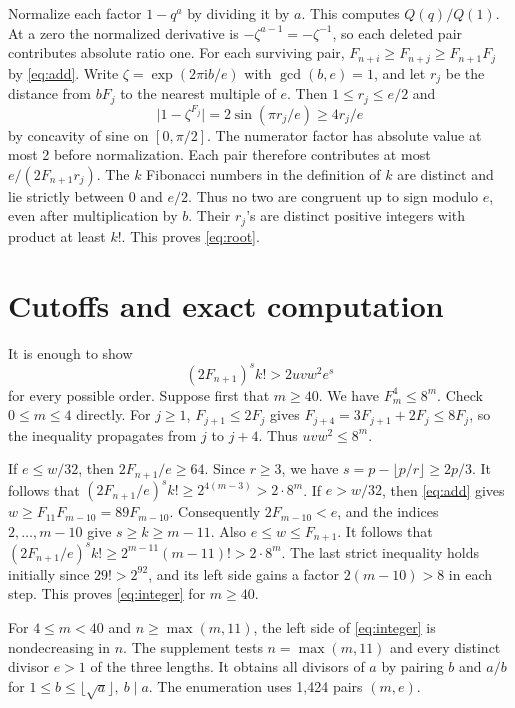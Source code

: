\documentclass[11pt]{article}
\newcommand{\abs}[1]{\lvert#1\rvert}
\begin{document}
Normalize each factor \(1-q^a\) by dividing it by \(a\). This
computes \(Q(q)/Q(1)\). At a zero the normalized derivative is
\(-\zeta^{a-1}=-\zeta^{-1}\), so each deleted pair contributes
absolute ratio one. For each surviving pair,
\(F_{n+i}\ge F_{n+j}\ge F_{n+1}F_j\) by \eqref{eq:add}.
Write \(\zeta=\exp(2\pi\mathrm{i}b/e)\) with \(\gcd(b,e)=1\), and
let \(r_j\) be the distance from \(bF_j\) to the nearest multiple
of \(e\). Then \(1\le r_j\le e/2\) and
\[
 \abs{1-\zeta^{F_j}}=2\sin(\pi r_j/e)\ge 4r_j/e
\]
by concavity of sine on \([0,\pi/2]\). The numerator factor has
absolute value at most 2 before normalization. Each pair therefore
contributes at most \(e/(2F_{n+1}r_j)\).
The \(k\) Fibonacci numbers in the definition of \(k\) are distinct
and lie strictly between 0 and \(e/2\). Thus no two are congruent
up to sign modulo \(e\), even after multiplication by \(b\).
Their \(r_j\)'s are distinct positive integers with product at least
\(k!\). This proves \eqref{eq:root}.

\section{Cutoffs and exact computation}
It is enough to show
\begin{equation}\label{eq:integer}
  (2F_{n+1})^s k!> 2uvw^2 e^s
\end{equation}
for every possible order. Suppose first that \(m\ge40\).
We have \(F_m^4\le8^m\). Check \(0\le m\le4\) directly. For \(j\ge1\),
\(F_{j+1}\le2F_j\) gives \(F_{j+4}=3F_{j+1}+2F_j\le8F_j\), so
the inequality propagates from \(j\) to \(j+4\). Thus \(uvw^2\le8^m\).

If \(e\le w/32\), then \(2F_{n+1}/e\ge64\).
Since \(r\ge3\), we have \(s=p-\lfloor p/r\rfloor\ge2p/3\).
It follows that \((2F_{n+1}/e)^s k!\ge 2^{4(m-3)}>2\cdot8^m\).
If \(e>w/32\), then \eqref{eq:add} gives
\(w\ge F_{11}F_{m-10}=89F_{m-10}\). Consequently
\(2F_{m-10}<e\), and the indices \(2,\ldots,m-10\) give
\(s\ge k\ge m-11\). Also \(e\le w\le F_{n+1}\).
It follows that \((2F_{n+1}/e)^s k!\ge 2^{m-11}(m-11)!>
2\cdot8^m\). The last strict inequality holds initially since
\(29!>2^{92}\), and its left side gains a factor \(2(m-10)>8\)
in each step. This proves \eqref{eq:integer} for \(m\ge40\).

For \(4\le m<40\) and \(n\ge\max(m,11)\), the left side of
\eqref{eq:integer} is nondecreasing in \(n\). The supplement tests
\(n=\max(m,11)\) and every distinct divisor \(e>1\) of the three
lengths. It obtains all divisors of \(a\) by pairing \(b\) and \(a/b\)
for \(1\le b\le\lfloor\sqrt a\rfloor,\ b\mid a\). The enumeration
uses 1,424 pairs \((m,e)\).
\end{document}
